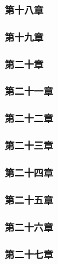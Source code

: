 \subsubsection{第十八章}



\subsubsection{第十九章}



\subsubsection{第二十章}



\subsubsection{第二十一章}



\subsubsection{第二十二章}



\subsubsection{第二十三章}



\subsubsection{第二十四章}



\subsubsection{第二十五章}



\subsubsection{第二十六章}



\subsubsection{第二十七章}



